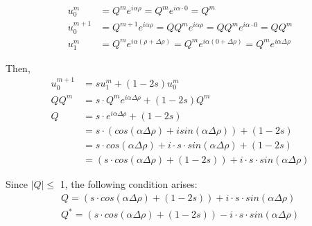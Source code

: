\documentclass[11pt]{article}
\begin{document}
    \begin{equation}
\begin{split}
u^{m}_{0} &= Q^{m}e^{i\alpha \rho} = Q^{m}e^{i\alpha \cdot 0} = Q^{m} \\
u^{m+1}_{0} &= Q^{m+1}e^{i\alpha \rho} = Q Q^{m}e^{i\alpha \rho} = Q Q^{m}e^{i\alpha \cdot 0} = Q Q^{m} \\
u^{m}_{1} &= Q^{m}e^{i\alpha (\rho + \Delta \rho)} = Q^{m}e^{i\alpha (0 + \Delta \rho)} = Q^{m}e^{i\alpha \Delta \rho}
\end{split}
\end{equation}

Then, \begin{equation}
\begin{split}
u_{0}^{m + 1} &= s u_{1}^m + (1 - 2s) u_{0}^m \\
Q Q^{m} &= s \cdot Q^{m}e^{i\alpha \Delta \rho} + (1-2s) Q^{m} \\
Q &= s \cdot e^{i\alpha \Delta \rho} + (1-2s) \\
&= s \cdot \left( cos(\alpha \Delta \rho) + i sin(\alpha \Delta \rho) \right) + (1-2s) \\
&= s \cdot cos(\alpha \Delta \rho) + i \cdot s \cdot sin(\alpha \Delta \rho)  + (1-2s) \\
&= \left( s \cdot cos(\alpha \Delta \rho) + (1-2s) \right)  + i \cdot s \cdot sin(\alpha \Delta \rho)  
\end{split}
\end{equation}

Since \(\vert Q \vert \leq\) 1, the following condition arises:
\begin{equation}
\begin{split}
Q = (s \cdot cos(\alpha \Delta \rho) + (1-2s) ) + i \cdot s \cdot sin(\alpha \Delta \rho)  \\
Q^{*} = (s \cdot cos(\alpha \Delta \rho) + (1-2s) ) - i \cdot s \cdot sin(\alpha \Delta \rho)  
\end{split}
\end{equation}
\end{document}
